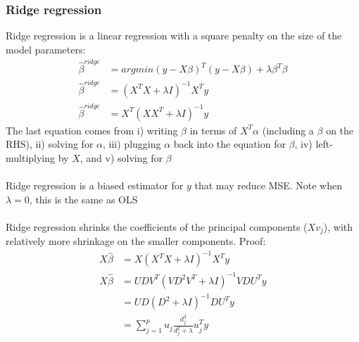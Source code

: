 \documentclass{article}
\begin{document}
\subsubsection{Ridge regression}
Ridge regression is a linear regression with a square penalty on the size of the model parameters:
\begin{align*}
  \hat{\beta}^{ridge} &= argmin(y - X\beta)^T(y - X\beta) + \lambda\beta^T\beta\\
  \hat{\beta}^{ridge} &= (X^TX + \lambda I)^{-1}X^Ty\\
  \hat{\beta}^{ridge} &= X^T(XX^T + \lambda I)^{-1}y
\end{align*}
The last equation comes from i) writing $\beta$ in terms of $X^T\alpha$ (including a $\beta$ on the RHS), ii) solving for $\alpha$, iii) plugging $\alpha$ back into the equation for $\beta$, iv) left-multiplying by $X$, and v) solving for $\beta$\\\\
Ridge regression is a biased estimator for $y$ that may reduce MSE. Note when $\lambda = 0$, this is the same as OLS\\\\
Ridge regression shrinks the coefficients of the principal components ($Xv_j$), with relatively more shrinkage on the smaller components. Proof:
\begin{align*}
  X\hat{\beta} &= X(X^TX + \lambda I)^{-1}X^Ty\\
  X\hat{\beta} &= UDV^T(VD^2V^T + \lambda I)^{-1}VDU^Ty\\
  &= UD(D^2 + \lambda I)^{-1}DU^Ty\\
  &= \sum_{j=1}^pu_j \frac{d_j^2}{d_j^2 + \lambda}u_j^Ty
\end{align*}
\end{document}
